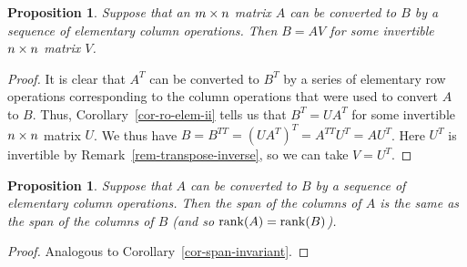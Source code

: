 \documentclass[reqno]{amsart}
\newtheorem{proposition}[theorem]{Proposition}
\theoremstyle{definition}
\begin{document}
\begin{proposition}\label{cor-co-elem}
 Suppose that an $m\times n$ matrix $A$ can be converted to $B$ by
 a sequence of elementary column operations.  Then $B=AV$ for
 some invertible $n\times n$ matrix $V$.
\end{proposition}
\begin{proof}
 It is clear that $A^T$ can be converted to $B^T$ by a series of
 elementary row operations corresponding to the column operations that
 were used to convert $A$ to $B$.  Thus,
 Corollary~\ref{cor-ro-elem-ii} tells us that $B^T=UA^T$ for some
 invertible $n\times n$ matrix $U$.  We thus have
 $B=B^{TT}=(UA^T)^T=A^{TT}U^T=AU^T$.  Here $U^T$ is invertible by
 Remark~\ref{rem-transpose-inverse}, so we can take $V=U^T$.
\end{proof}

\begin{proposition}\label{prop-co-rank}
 Suppose that $A$ can be converted to $B$ by a sequence of elementary
 column operations.  Then the span of the columns of $A$ is the same
 as the span of the columns of $B$ (and so $\operatorname{rank}(A)=\operatorname{rank}(B)$).
\end{proposition}
\begin{proof}
 Analogous to Corollary~\ref{cor-span-invariant}.
\end{proof}
\end{document}
